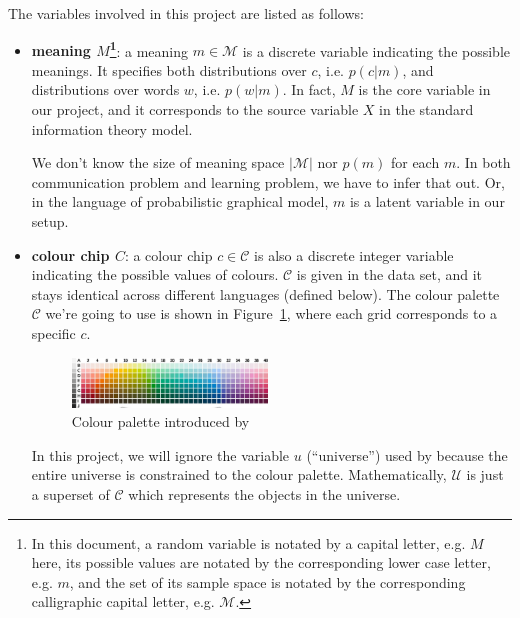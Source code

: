 \documentclass[11pt]{article}
\begin{document}
The variables involved in this project are listed as follows:
\begin{itemize}[leftmargin=*]
    \item \textbf{meaning $M$\footnote{In this document, a random variable is notated by a capital letter, e.g. $M$ here, its possible values are notated by the corresponding lower case letter, e.g. $m$, and the set of its sample space is notated by the corresponding calligraphic capital letter, e.g. $\mathcal{M}$.}}: a meaning $m\in\mathcal{M}$ is a discrete variable indicating the possible meanings.
    It specifies both distributions over $c$, i.e. $p(c|m)$, and distributions over words $w$, i.e. $p(w|m)$.
    In fact, $M$ is the core variable in our project, and it corresponds to the source variable $X$ in the standard information theory model.
    
    We don't know the size of meaning space $|\mathcal{M}|$ nor $p(m)$ for each $m$.
    In both communication problem and learning problem, we have to infer that out.
    Or, in the language of probabilistic graphical model, $m$ is a latent variable in our setup.

    \item \textbf{colour chip $C$}: a colour chip $c\in\mathcal{C}$ is also a discrete integer variable indicating the possible values of colours. 
    $\mathcal{C}$ is given in the data set, and it stays identical across different languages (defined below). 
    The colour palette $\mathcal{C}$ we're going to use is shown in Figure~\ref{fig:colour_palette}, where each grid corresponds to a specific $c$.
        \begin{figure}[h]
            \centering
            \includegraphics[width=0.49\textwidth]{docs/intro_rate_distortion/graphs/colour_palette.jpg}
            \caption{Colour palette introduced by \citet{berlin1991basic}}
            \label{fig:colour_palette}
        \end{figure}
        
    In this project, we will ignore the variable $u$ (``universe'') used by \citet{zaslavsky2018efficient} because the entire universe is constrained to the colour palette. 
    Mathematically, $\mathcal{U}$ is just a superset of $\mathcal{C}$ which represents the objects in the universe.
    

\end{itemize}
\end{document}
